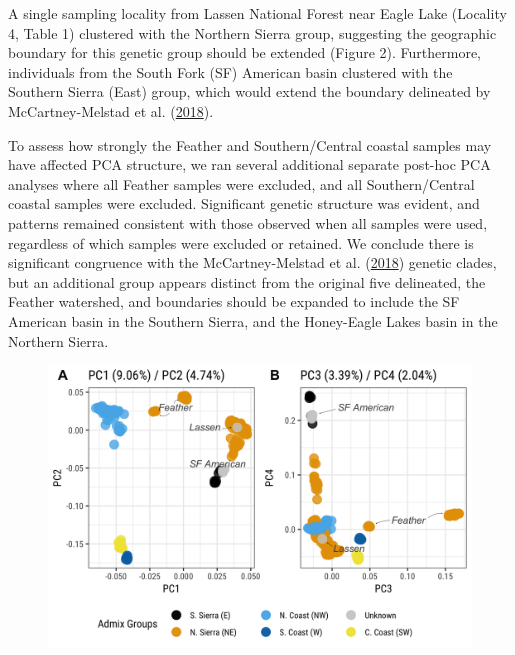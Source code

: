 \documentclass[proquest,12pt,final]{ucthesis-CA2012} %
\begin{document}
\begin{ucmainmatter}
A single sampling locality from Lassen National Forest near Eagle Lake
(Locality 4, Table 1) clustered with the Northern Sierra group,
suggesting the geographic boundary for this genetic group should be
extended (Figure 2). Furthermore, individuals from the South Fork (SF)
American basin clustered with the Southern Sierra (East) group, which
would extend the boundary delineated by McCartney-Melstad et al.
(\protect\hyperlink{ref-mccartney-melstad_population_2018}{2018}).

To assess how strongly the Feather and Southern/Central coastal samples
may have affected PCA structure, we ran several additional separate
post-hoc PCA analyses where all Feather samples were excluded, and all
Southern/Central coastal samples were excluded. Significant genetic
structure was evident, and patterns remained consistent with those
observed when all samples were used, regardless of which samples were
excluded or retained. We conclude there is significant congruence with
the McCartney-Melstad et al.
(\protect\hyperlink{ref-mccartney-melstad_population_2018}{2018})
genetic clades, but an additional group appears distinct from the
original five delineated, the Feather watershed, and boundaries should
be expanded to include the SF American basin in the Southern Sierra, and
the Honey-Eagle Lakes basin in the Northern Sierra.









\begin{figure}

{\centering \includegraphics[width=0.95\linewidth]{figure/ch3/fig_02_pca_12_34_all_rabo_filt10_1_100k_thresh_annot} 

}
\end{figure}
\end{ucmainmatter}
\end{document}

